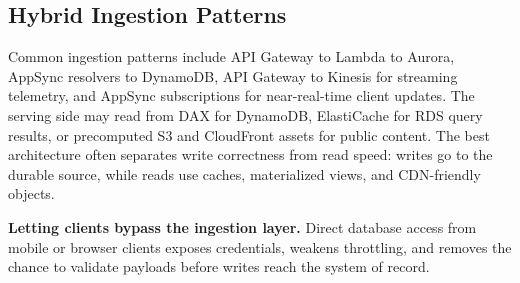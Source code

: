 \subsection{Hybrid Ingestion Patterns}
Common ingestion patterns include API Gateway to Lambda to Aurora, AppSync resolvers to DynamoDB, API Gateway to Kinesis for streaming telemetry, and AppSync subscriptions for near-real-time client updates. The serving side may read from DAX for DynamoDB, ElastiCache for RDS query results, or precomputed S3 and CloudFront assets for public content. The best architecture often separates write correctness from read speed: writes go to the durable source, while reads use caches, materialized views, and CDN-friendly objects.
\begin{pitfall}
\textbf{Letting clients bypass the ingestion layer.} Direct database access from mobile or browser clients exposes credentials, weakens throttling, and removes the chance to validate payloads before writes reach the system of record.
\end{pitfall}
